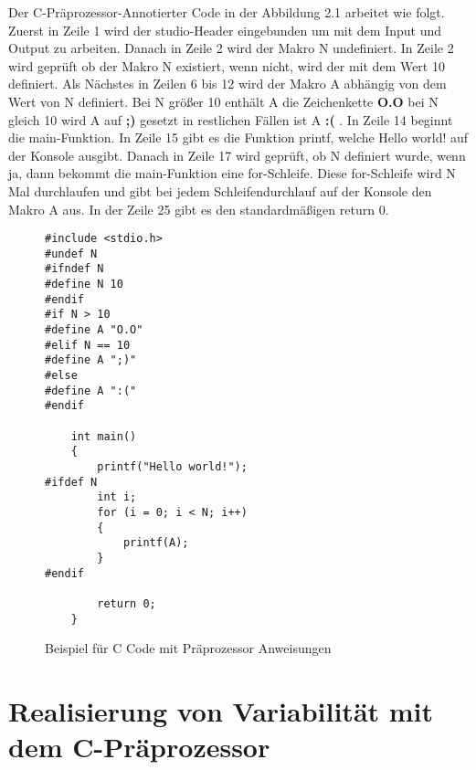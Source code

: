 Der C-Präprozessor-Annotierter Code in der Abbildung 2.1 arbeitet wie folgt. Zuerst in Zeile 1 wird der studio-Header eingebunden um mit dem Input und Output zu arbeiten. Danach in Zeile 2 wird der Makro N undefiniert. In Zeile 2 wird geprüft ob der Makro N existiert, wenn nicht, wird der mit dem Wert 10 definiert. Als Nächstes in Zeilen 6 bis 12 wird der Makro A abhängig von dem Wert von N definiert. Bei N größer 10 enthält A die Zeichenkette \textbf{O.O}  bei N gleich 10 wird A auf \textbf{;)}  gesetzt in restlichen Fällen ist A  \textbf{:(}  . In Zeile 14 beginnt die main-Funktion. In Zeile 15 gibt es die Funktion printf, welche Hello world! auf der Konsole ausgibt. Danach in Zeile 17 wird geprüft, ob N definiert wurde, wenn ja, dann bekommt die main-Funktion eine for-Schleife. Diese for-Schleife wird N Mal durchlaufen und gibt bei jedem Schleifendurchlauf auf der Konsole den Makro A aus. In der Zeile 25 gibt es den standardmäßigen return 0. 



\lstset{escapechar=@,style=customc}
\begin{figure}[H]
\hspace*{3cm}
\begin{minipage}{\textwidth}
\begin{lstlisting}
#include <stdio.h>
#undef N
#ifndef N
#define N 10
#endif	
#if N > 10
#define A "O.O"
#elif N == 10
#define A ";)"
#else
#define A ":("
#endif
	
	int main()
	{
		printf("Hello world!");
#ifdef N
		int i;
		for (i = 0; i < N; i++)
		{
			printf(A);
		}
#endif
		
		return 0;
	}
\end{lstlisting}
\end{minipage}
%
\caption{Beispiel für C Code mit Präprozessor Anweisungen}
\end{figure}


\section{Realisierung von Variabilität mit dem C-Präprozessor}

